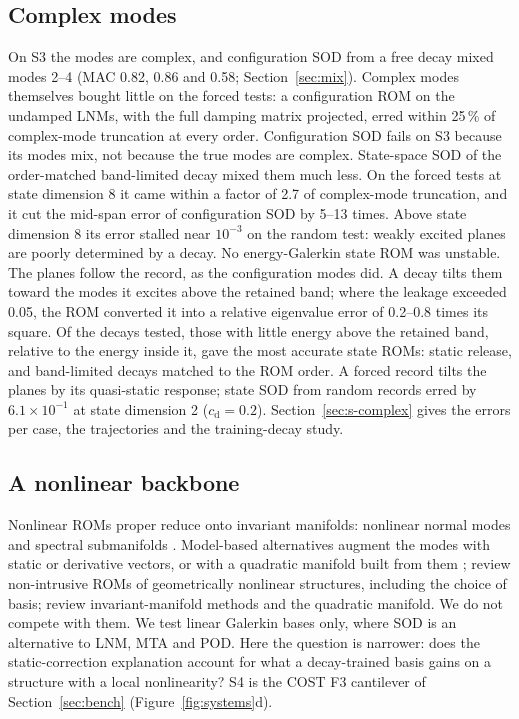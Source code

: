 \documentclass[preprint,12pt]{elsarticle}
\begin{document}
\subsection{Complex modes}\label{sec:complex}
On S3 the modes are complex, and configuration SOD from a free decay mixed modes 2--4 (MAC 0.82, 0.86 and 0.58; Section~\ref{sec:mix}). Complex modes themselves bought little on the forced tests: a configuration ROM on the undamped LNMs, with the full damping matrix projected, erred within 25\,\% of complex-mode truncation at every order. Configuration SOD fails on S3 because its modes mix, not because the true modes are complex.
State-space SOD of the order-matched band-limited decay mixed them much less. On the forced tests at state dimension 8 it came within a factor of 2.7 of complex-mode truncation, and it cut the mid-span error of configuration SOD by 5--13 times. Above state dimension 8 its error stalled near $10^{-3}$ on the random test: weakly excited planes are poorly determined by a decay. No energy-Galerkin state ROM was unstable.
The planes follow the record, as the configuration modes did. A decay tilts them toward the modes it excites above the retained band; where the leakage exceeded 0.05, the ROM converted it into a relative eigenvalue error of 0.2--0.8 times its square. Of the decays tested, those with little energy above the retained band, relative to the energy inside it, gave the most accurate state ROMs: static release, and band-limited decays matched to the ROM order. A forced record tilts the planes by its quasi-static response; state SOD from random records erred by $6.1\times10^{-1}$ at state dimension 2 ($c_{\mathrm d}=0.2$). Section~\ref{sec:s-complex} gives the errors per case, the trajectories and the training-decay study.

\subsection{A nonlinear backbone}\label{sec:nlbb}
Nonlinear ROMs proper reduce onto invariant manifolds: nonlinear normal modes \citep{Shaw1993,Touze2004} and spectral submanifolds \citep{Haller2016,Cenedese2022}. Model-based alternatives augment the modes with static or derivative vectors, or with a quadratic manifold built from them \citep{Idelsohn1985,Jain2017}; \citet{Mignolet2013} review non-intrusive ROMs of geometrically nonlinear structures, including the choice of basis; \citet{Touze2021} review invariant-manifold methods and the quadratic manifold. We do not compete with them. We test linear Galerkin bases only, where SOD is an alternative to LNM, MTA and POD. Here the question is narrower: does the static-correction explanation account for what a decay-trained basis gains on a structure with a local nonlinearity?
S4 is the COST F3 cantilever of Section~\ref{sec:bench} (Figure~\ref{fig:systems}d).
\end{document}
